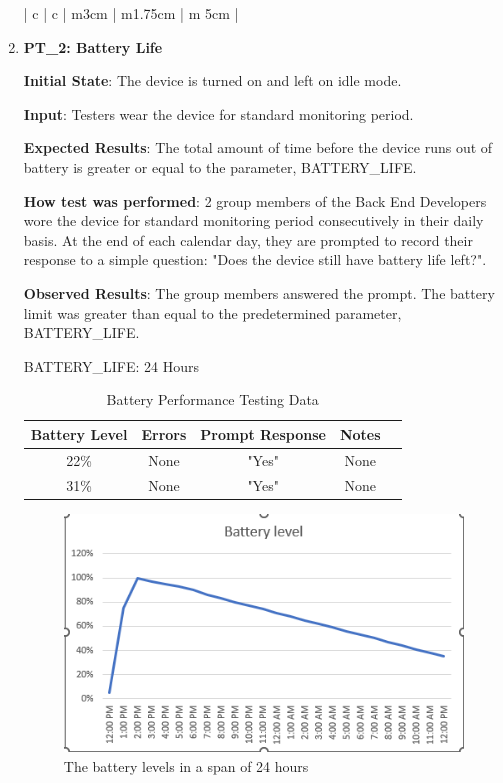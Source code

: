 \documentclass[12pt, titlepage]{article}
\begin{document}
\begin{enumerate}
\begin{table}[H]
\begin{tabular}{| c | c | m{3cm} | m{1.75cm} | m {5cm} |}
  \end{tabular}
\caption{Data Transfer Time Testing Data}
\end{table}
  \item\textbf{{PT\_2: Battery Life\\}}\label{PT2}

  \textbf{Initial State}: The device is turned on and left on idle mode.

  \textbf{Input}: Testers wear the device for standard monitoring period.

  \textbf{Expected Results}: The total amount of time before the device runs out of battery is greater or equal to the parameter, BATTERY\_LIFE.

  \textbf{How test was performed}: 2 group members of the Back End Developers wore the device for standard monitoring period consecutively in their daily basis. At the end of each calendar day, they are prompted to record their response to a simple question: "Does the device still have battery life left?".

  \textbf{Observed Results}: The group members answered the prompt. The battery limit was greater than equal to the predetermined parameter, BATTERY\_LIFE.

BATTERY\_LIFE: 24 Hours

\begin{table}[H]
\centering
  \begin{tabular}{| c | c | c | c | c |}
\hline
    \textbf{Battery Level} & \textbf{Errors} & \textbf{Prompt Response} & \textbf{Notes }\\
\hline
22\% & None & "Yes" & None \\
\hline
31\% & None & "Yes" & None \\
\hline
  \end{tabular}
\caption{Battery Performance Testing Data}
\end{table}

\begin{figure} [H]
\centering
  \includegraphics{battery_level}
	\caption{The battery levels in a span of 24 hours}
\label{fig:battery_level}
\end{figure}

\end{enumerate}
\end{document}
